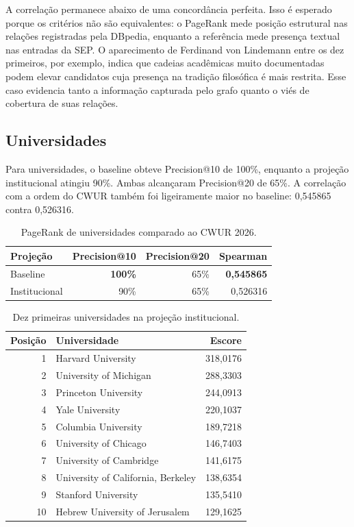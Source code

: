 \documentclass[10pt,a4paper]{article}
\begin{document}
A correlação permanece abaixo de uma concordância perfeita. Isso é esperado porque os critérios não são equivalentes: o PageRank mede posição estrutural nas relações registradas pela DBpedia, enquanto a referência mede presença textual nas entradas da SEP. O aparecimento de Ferdinand von Lindemann entre os dez primeiros, por exemplo, indica que cadeias acadêmicas muito documentadas podem elevar candidatos cuja presença na tradição filosófica é mais restrita. Esse caso evidencia tanto a informação capturada pelo grafo quanto o viés de cobertura de suas relações.

\subsection{Universidades}

Para universidades, o baseline obteve Precision@10 de 100\%, enquanto a projeção institucional atingiu 90\%. Ambas alcançaram Precision@20 de 65\%. A correlação com a ordem do CWUR também foi ligeiramente maior no baseline: 0,545865 contra 0,526316.

\begin{table}[htbp]
  \centering
  \caption{PageRank de universidades comparado ao CWUR 2026.}
  \label{tab:resultado-universidades}
  \begin{tabular}{lrrr}
    \toprule
    Projeção & Precision@10 & Precision@20 & Spearman \\
    \midrule
    Baseline & \textbf{100\%} & 65\% & \textbf{0,545865} \\
    Institucional & 90\% & 65\% & 0,526316 \\
    \bottomrule
  \end{tabular}
\end{table}

\begin{table}[htbp]
  \centering
  \caption{Dez primeiras universidades na projeção institucional.}
  \label{tab:top-universidades}
  \begin{tabular}{r l r}
    \toprule
    Posição & Universidade & Escore \\
    \midrule
    1 & Harvard University & 318,0176 \\
    2 & University of Michigan & 288,3303 \\
    3 & Princeton University & 244,0913 \\
    4 & Yale University & 220,1037 \\
    5 & Columbia University & 189,7218 \\
    6 & University of Chicago & 146,7403 \\
    7 & University of Cambridge & 141,6175 \\
    8 & University of California, Berkeley & 138,6354 \\
    9 & Stanford University & 135,5410 \\
    10 & Hebrew University of Jerusalem & 129,1625 \\
    \bottomrule
  \end{tabular}
\end{table}
\end{document}
